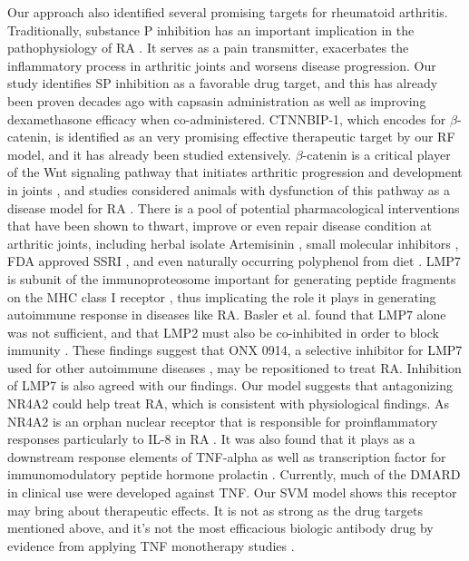     Our approach also identified several promising targets for rheumatoid arthritis. Traditionally, substance P inhibition has an important implication in the pathophysiology of RA \cite{lisowska2015substance,garrett1992role,green2005gastrin,keeble2004role,lotz1987substance,okamura2017dual,lam1990mediators,lam1991neurogenic}. It serves as a pain transmitter, exacerbates the inflammatory process in arthritic joints and worsens disease progression. Our study identifies SP inhibition as a favorable drug target, and this has already been proven decades ago with capsasin administration \cite{lam1989capsaicin} as well as improving dexamethasone \cite{lam2010substance} efficacy when co-administered. CTNNBIP-1, which encodes for $\beta$-catenin, is identified as an very promising effective therapeutic target by our RF model, and it has already been studied extensively. $\beta$-catenin is a critical player of the Wnt signaling pathway that initiates arthritic progression and development in joints \cite{sen2005wnt,zhou2017wnt}, and studies considered animals with dysfunction of this pathway as a disease model for RA \cite{wu2010beta,zhou2017wnt}. There is a pool of potential pharmacological interventions that have been shown to thwart, improve or even repair disease condition at arthritic joints, including herbal isolate Artemisinin \cite{zhong2018artemisinin}, small molecular inhibitors \cite{lietman2018inhibition,landman2013small,landman2013small,dell2017pharmacological}, FDA approved SSRI \cite{miyamoto2017fluoxetine}, and even naturally occurring polyphenol from diet \cite{li2018resveratrol}. LMP7 is subunit of the immunoproteosome important for generating peptide fragments on the MHC class I receptor \cite{joeris2012proteasome}, thus implicating the role it plays in generating autoimmune response in diseases like RA. Basler et al. found that LMP7 alone was not sufficient, and that LMP2 must also be co-inhibited in order to block immunity \cite{basler2018co}. These findings suggest that ONX 0914, a selective inhibitor for LMP7 used for other autoimmune diseases \cite{althof2018immunoproteasome,liu2017onx,verbrugge2012targeting}, may be repositioned to treat RA. Inhibition of LMP7 is also agreed with our findings. Our model suggests that antagonizing NR4A2 could help treat RA, which is consistent with physiological findings. As NR4A2 is an orphan nuclear receptor that is responsible for proinflammatory responses particularly to IL-8 in RA \cite{aherne2009identification}. It was also found that it plays as a downstream response elements of TNF-alpha \cite{mix2012orphan} as well as transcription factor for immunomodulatory peptide hormone prolactin \cite{mccoy2015orphan}. Currently, much of the DMARD in clinical use were developed against TNF. Our SVM model shows this receptor may bring about therapeutic effects. It is not as strong as the drug targets mentioned above, and it's not the most efficacious biologic antibody drug by evidence from applying TNF monotherapy studies\cite{aletaha2018diagnosis} .
  
